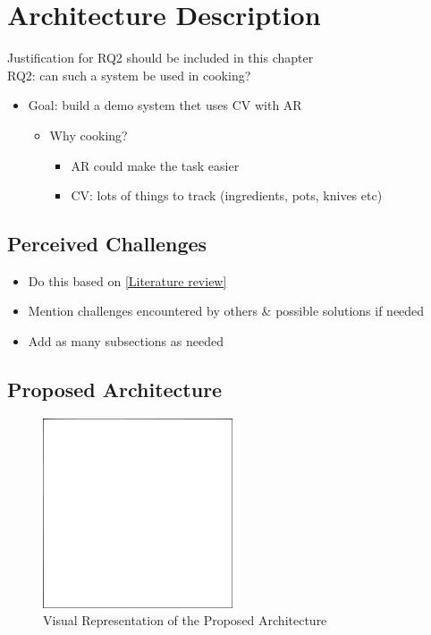\chapter{Architecture Description} \label{Arch description}

Justification for RQ2 should be included in this chapter \\
RQ2: can such a system be used in cooking?
\begin{itemize}
	\item{Goal: build a demo system thet uses CV with AR}
	\begin{itemize}
		\item{Why cooking?}
		\begin{itemize}
			\item{AR could make the task easier}
			\item{CV: lots of things to track (ingredients, pots, knives etc)}
		\end{itemize}
	\end{itemize}
\end{itemize}

\section{Perceived Challenges} \label{challenges}

\begin{itemize}
	\item{Do this based on \ref{Literature review}}
	\item{Mention challenges encountered by others & possible solutions if needed}
	\item{Add as many subsections as needed}
\end{itemize}

\section{Proposed Architecture} \label{arch}

\begin{figure}
\centering \includegraphics[width=0.5\textwidth]{kuvat/placeholder.png}
\caption{Visual Representation of the Proposed Architecture}
\label{Arch fig} 
\end{figure}

